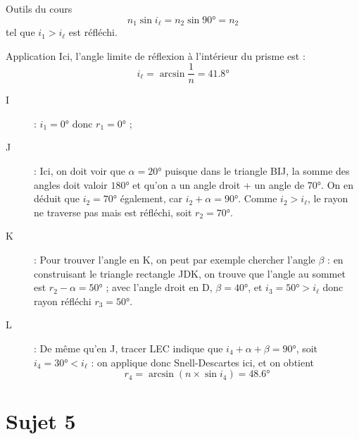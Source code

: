 \documentclass[a4paper, 11pt, oneside]{book}
\begin{document}
{\begin{tcbraster}[raster columns=3, raster equal height=rows]
\begin{tcolorbox}[blankest, raster multicolumn=1, space to=\myspace]
\begin{tcbraster}[raster columns=1]
\begin{NCrapp}{Outils du cours}
                \[ n_1\sin i_\ell = n_2\sin \ang{90;;} = n_2\]
                tel que $i_1 > i_\ell$ est réfléchi.
            \end{NCrapp}
        \end{tcbraster}
    \end{tcolorbox}
\end{tcbraster}
\begin{NCexem}[sidebyside]{Application}
    Ici, l'angle limite de réflexion à l'intérieur du prisme est : \[i_\ell =
    \arcsin \frac{1}{n} = \boxed{ \ang{41.8;;}}\]
    \begin{description}
        \item[I] : $\boxed{i_1 = \ang{0;;}}$ donc
            $\boxed{r_1 = \ang{0;;}}$ ;
        \item[J] : Ici, on doit voir que $\alpha = \ang{20;;}$ puisque
            dans le triangle BIJ, la somme des angles doit valoir $\ang{180;;}$
            et qu'on a un angle droit + un angle de \ang{70;;}.
            On en déduit que $\boxed{i_2 = \ang{70;;}}$ également, car
            $i_2 + \alpha = \ang{90;;}$.\smallbreak
            Comme \underline{$i_2 > i_\ell$}, le rayon ne traverse pas mais est
            réfléchi, soit $\boxed{r_2 = \ang{70;;}}$.
    \end{description}
    \tcblower
    \begin{description}
        \item[K] : Pour trouver l'angle en K, on peut par exemple chercher
            l'angle $\beta$ : en construisant le triangle rectangle JDK, on
            trouve que l'angle au sommet est $r_2 - \alpha = \ang{50;;}$ ;
            avec l'angle droit en D, $\beta = \ang{40;;}$, et $\boxed{i_3
            = \ang{50;;} > i_\ell}$ donc rayon réfléchi $\boxed{r_3 =
        \ang{50;;}}$.
        \item[L] : De même qu'en J, tracer LEC indique que $i_4 + \alpha + \beta
            = \ang{90;;}$, soit $\boxed{i_4 = \ang{30;;} < i_\ell}$
            : on applique donc Snell-Descartes ici, et on obtient
            \[\boxed{r_4} = \arcsin (n\times \sin i_4) =
            \boxed{\ang{48.6;;}}\]
    \end{description}
\end{NCexem}

}

\resetQ
\newpage

\chapter{Sujet 5}
\end{document}
